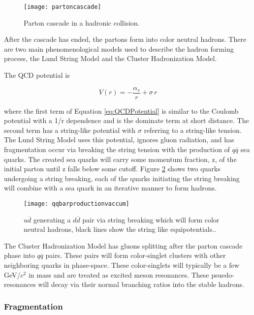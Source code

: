 \begin{figure}[h]
\texttt{[image: partoncascade]}
\centering
\caption{Parton cascade in a hadronic collision\cite{Webber:1994zd}.}
\label{fig:pcascade}
\end{figure}

\noindent
After the cascade has ended, the partons form into color neutral hadrons.  There are two main phenomenological models used to describe the hadron forming process, the Lund String Model and the Cluster Hadronization Model.  

The QCD potential is

\begin{equation}
V(r) = - \frac{\alpha_{s}}{r} + \sigma \, r
\label{eq:QCDPotential}
\end{equation}

\noindent
where the first term of Equation \ref{eq:QCDPotential} is similar to the Coulomb potential with a 1/r dependence and is the dominate term at short distance.  The second term has a string-like potential with $\sigma$ referring to a string-like tension.  The Lund String Model uses this potential, ignores gluon radiation, and has fragmentation occur via breaking the string tension with the production of $q\overline{q}$ sea quarks.  The created sea quarks will carry some momentum fraction, z, of the initial parton until z falls below some cutoff.  Figure \ref{fig:qqbarstring} shows two quarks undergoing a string breaking, each of the quarks initiating the string breaking will combine with a sea quark in an iterative manner to form hadrons.  


\begin{figure}[h]
\texttt{[image: qqbarproductionvaccum]}
\centering
\caption{$u \overline{d}$ generating a $d \overline{d}$ pair via string breaking which will form color neutral hadrons, black lines show the string like equipotentials.\cite{Andersson:2002ap}.}
\label{fig:qqbarstring}
\end{figure}

The Cluster Hadronization Model has gluons splitting after the parton cascade phase into $q\overline{q}$ pairs.  These pairs will form color-singlet clusters with other neighboring quarks in phase-space.  These color-singlets will typically be a few GeV/\textit{$c^{2}$} in mass and are treated as excited meson resonances.  These psuedo-resonances will decay via their normal branching ratios into the stable hadrons\cite{Webber:1983if}.

\subsubsection{Fragmentation}

